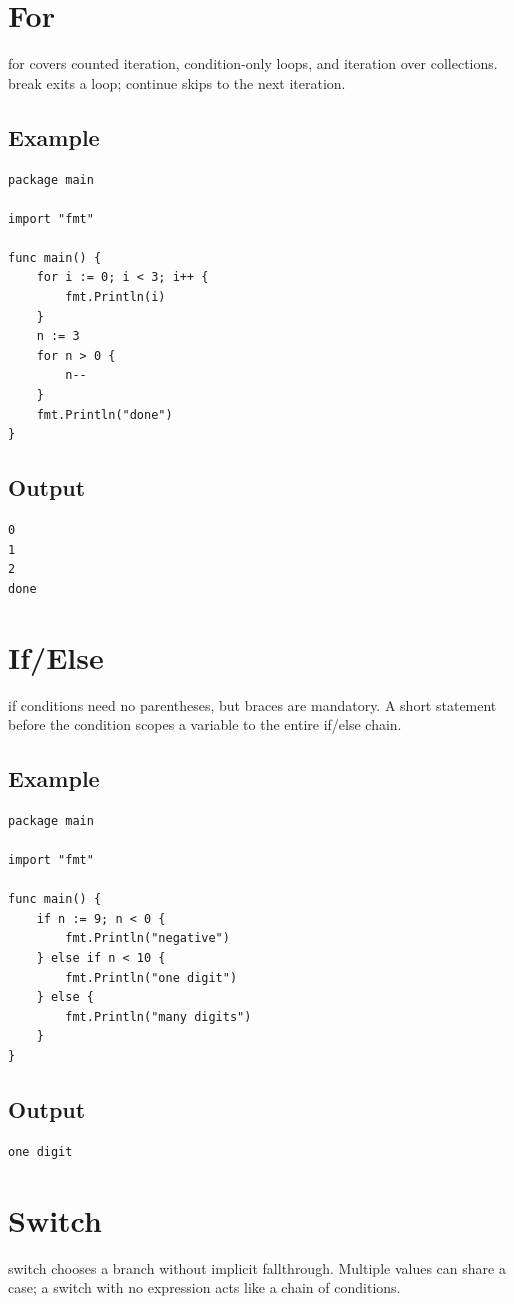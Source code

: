 \documentclass[10pt,oneside]{article}
\newcommand{\sectionline}{\par\vspace{4pt}{\color{rule}\hrule height .5pt}\vspace{7pt}\color{ink}\noindent}
\begin{document}
\section{For}
\sectionline
for covers counted iteration, condition-only loops, and iteration over collections. break exits a loop; continue skips to the next iteration.\par
\subsection*{Example}
\begin{lstlisting}[style=gocode]
package main

import "fmt"

func main() {
	for i := 0; i < 3; i++ {
		fmt.Println(i)
	}
	n := 3
	for n > 0 {
		n--
	}
	fmt.Println("done")
}
\end{lstlisting}
\subsection*{Output}
\begin{lstlisting}[style=terminal]
0
1
2
done
\end{lstlisting}
\clearpage
\section{If/Else}
\sectionline
if conditions need no parentheses, but braces are mandatory. A short statement before the condition scopes a variable to the entire if/else chain.\par
\subsection*{Example}
\begin{lstlisting}[style=gocode]
package main

import "fmt"

func main() {
	if n := 9; n < 0 {
		fmt.Println("negative")
	} else if n < 10 {
		fmt.Println("one digit")
	} else {
		fmt.Println("many digits")
	}
}
\end{lstlisting}
\subsection*{Output}
\begin{lstlisting}[style=terminal]
one digit
\end{lstlisting}
\clearpage
\section{Switch}
\sectionline
switch chooses a branch without implicit fallthrough. Multiple values can share a case; a switch with no expression acts like a chain of conditions.\par
\end{document}
